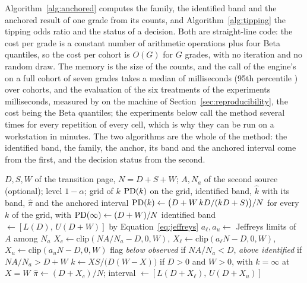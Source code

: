 Algorithm~\ref{alg:anchored} computes the family, the identified band and the anchored result of one grade from its counts, and Algorithm~\ref{alg:tipping} the tipping odds ratio and the status of a decision. Both are straight-line code: the cost per grade is a constant number of arithmetic operations plus four Beta quantiles, so the cost per cohort is $O(G)$ for $G$ grades, with no iteration and no random draw. The memory is the size of the counts, and the call of the engine's  on a full cohort of seven grades takes a median of  milliseconds (95th percentile ) over  cohorts, and the evaluation of the six treatments of the experiments  milliseconds, measured by  on the machine of Section~\ref{sec:reproducibility}, the cost being the Beta quantiles; the experiments below call the method several times for every repetition of every cell, which is why they can be run on a workstation in minutes. The two algorithms are the whole of the method: the identified band, the family, the anchor, its band and the anchored interval come from the first, and the decision status from the second.

\begin{algorithm}[htbp]
\caption{Anchored PD of one grade: the family $\pdk(k)$, the identified band and the anchored interval, from the counts of the transition page and of a second source.}
\label{alg:anchored}
\begin{algorithmic}[1]
\Require $D,S,W$ of the transition page, $N=D+S+W$; $A,N_a$ of the second source (optional); level $1-\alpha$; grid of $k$
\Ensure $\pdk(k)$ on the grid, identified band, $\widehat k$ with its band, $\widehat\pi$ and the anchored interval
\State $\mathrm{PD}(k)\gets\big(D+W\,kD/(kD+S)\big)/N$ for every $k$ of the grid, with $\mathrm{PD}(\infty)\gets(D+W)/N$
\State identified band $\gets[L(D),\,U(D+W)]$ by Equation~\eqref{eq:jeffreys}
  \State $a_{\ell},a_{u}\gets$ Jeffreys limits of $A$ among $N_a$
  \State $X_c\gets\mathrm{clip}(NA/N_a-D,0,W)$, $X_{\ell}\gets\mathrm{clip}(a_{\ell}N-D,0,W)$, $X_{u}\gets\mathrm{clip}(a_{u}N-D,0,W)$
  \State flag \emph{below observed} if $NA/N_a<D$, \emph{above identified} if $NA/N_a>D+W$
    \State $k\gets XS/\big(D(W-X)\big)$ if $D>0$ and $W>0$, with $k=\infty$ at $X=W$
  \EndFor
  \State $\widehat\pi\gets(D+X_c)/N$; interval $\gets[L(D+X_{\ell}),\,U(D+X_{u})]$
\EndIf
\end{algorithmic}
\end{algorithm}

